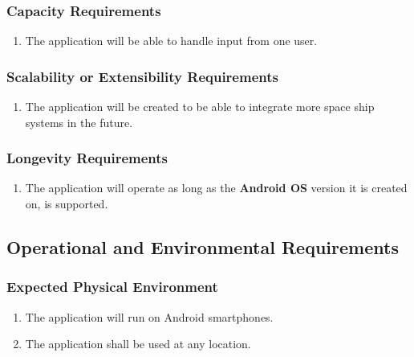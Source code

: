 \documentclass[12pt, titlepage]{article}
\begin{document}
\subsubsection{Capacity Requirements}
\label{ssub:capacity_requirements}
\begin{enumerate}[{PR}4. ]
	\item The application will be able to handle input from one user.
\end{enumerate}

\subsubsection{Scalability or Extensibility Requirements}
\label{ssub:scalability_or_extensibility_requirements}
\begin{enumerate}[{PR}5. ]
	\item The application will be created to be able to integrate more space ship systems in the future.
\end{enumerate}

\subsubsection{Longevity Requirements}
\label{ssub:longevity_requirements}
\begin{enumerate}[{PR}6. ]
	\item The application will operate as long as the  \textbf{Android OS} version it is created on, is supported.
\end{enumerate}


\subsection{Operational and Environmental Requirements}
\label{sub:operational_and_environmental_requirements}

\subsubsection{Expected Physical Environment}
\label{ssub:expected_physical_environment}
\begin{enumerate}[{OE}1. ]
	\item The application will run on Android smartphones.
	\item The application shall be used at any location.
\end{enumerate}
\end{document}

